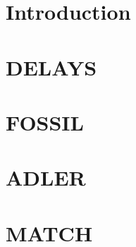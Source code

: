 \documentclass[
    fontsize=10pt,
    twoside=true,
    numbers=noenddot
]{cls/phdbyphd}
\newcommand\home{./}  %
\begin{document}
    \let\cleardoublepage\bigskip
    \let\clearpage\bigskip

    \listoftables


\endgroup


\mainmatter
{}


\setchapterpreamble[u]{\margintoc}
\chapter{Introduction}


\renewcommand\home{papers/time-delays/}
\setchapterpreamble[u]{\margintoc}
\chapter{DELAYS}


\renewcommand\home{papers/fossil/}
\setchapterpreamble[u]{\margintoc}
\chapter{FOSSIL}


\renewcommand\home{papers/adler/}
\setchapterpreamble[u]{\margintoc}
\chapter{ADLER}


\renewcommand\home{papers/slacs-matching/}
\setchapterpreamble[u]{\margintoc}
\chapter{MATCH}


\appendix


\renewcommand\home{./}

\end{document}
